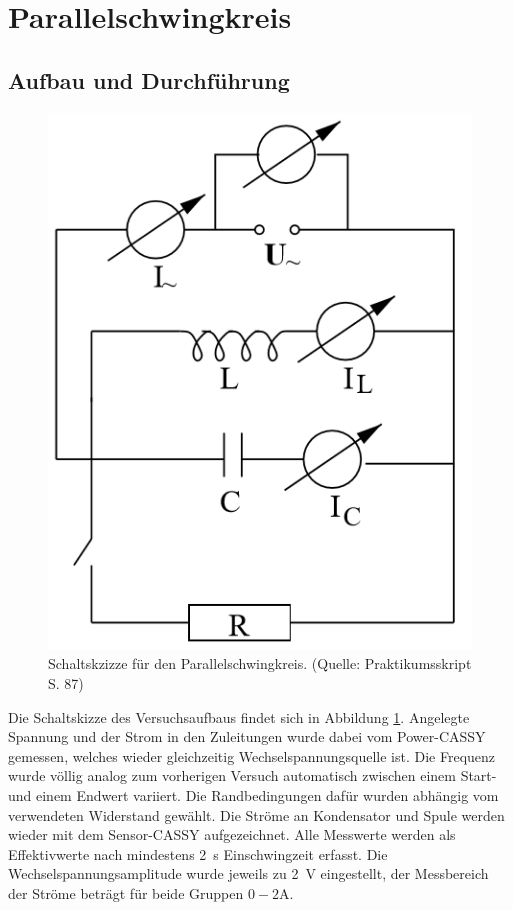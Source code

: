 \documentclass[12pt,a4paper]{article}
\begin{document}
\newpage

\section{Parallelschwingkreis}

\subsection{Aufbau und Durchführung}

\begin{figure}
\centering
\includegraphics[scale=0.8]{Bilder/AufbauParallel.png}
\caption{Schaltskzizze für den Parallelschwingkreis. (Quelle: Praktikumsskript S. 87)}
\label{fig:AufbauParallel}
\end{figure}

Die Schaltskizze des Versuchsaufbaus findet sich in Abbildung \ref{fig:AufbauParallel}. Angelegte Spannung und der Strom in den Zuleitungen wurde dabei vom Power-CASSY gemessen, welches wieder gleichzeitig Wechselspannungsquelle ist. Die Frequenz wurde völlig analog zum vorherigen Versuch automatisch zwischen einem Start- und einem Endwert variiert. Die Randbedingungen dafür wurden abhängig vom verwendeten Widerstand gewählt. 
Die Ströme an Kondensator und Spule werden wieder mit dem Sensor-CASSY aufgezeichnet. Alle Messwerte werden als Effektivwerte nach mindestens \SI{2}{\s} Einschwingzeit erfasst.
Die Wechselspannungsamplitude wurde jeweils zu \SI{2}{\V} eingestellt, der Messbereich der Ströme beträgt für beide Gruppen $0-2$A.
\end{document}
